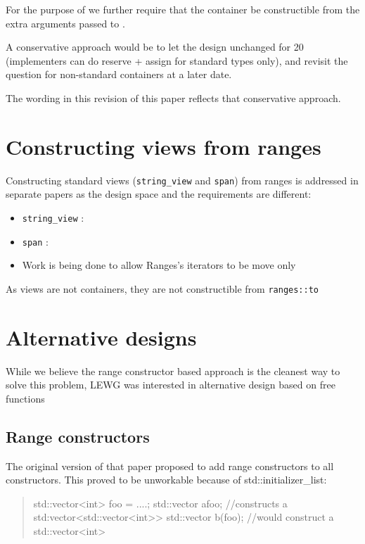 \documentclass{wg21}
\newcommand{\cc}[1]{\texttt{#1}}
\begin{document}
For the purpose of  we further require that the container be constructible 
from the extra arguments passed to .


A conservative approach would be to let the design unchanged for 20 (implementers can do reserve + assign for standard types only),
and revisit the question for non-standard containers at a later date.

The wording in this revision of this paper reflects that conservative approach.



\section{Constructing views from ranges}

Constructing standard views (\cc{string_view} and \cc{span}) from ranges is addressed in separate papers as
the design space and the requirements are different:

\begin{itemize}
	\item \cc{string_view} : \cite{P1391}
	\item  \cc{span}       : \cite{P1394}
	\item Work is being done to allow Ranges's iterators to be move only
\end{itemize}

As views are not containers, they are not constructible from \cc{ranges::to}


\section{Alternative designs}

While we believe the range constructor based approach is the cleanest way to solve this problem,
LEWG was interested in alternative design based on free functions

\subsection{Range constructors}

The original version of that paper proposed to add range constructors to all constructors.
This proved to be unworkable because of std::initializer_list:

\begin{quote}
	\begin{codeblock}
		std::vector<int> foo = ....;
		std::vector a{foo}; //constructs a std:vector<std::vector<int>>
		std::vector b(foo); //would construct a std::vector<int>
	\end{codeblock}
\end{quote}
\end{document}

